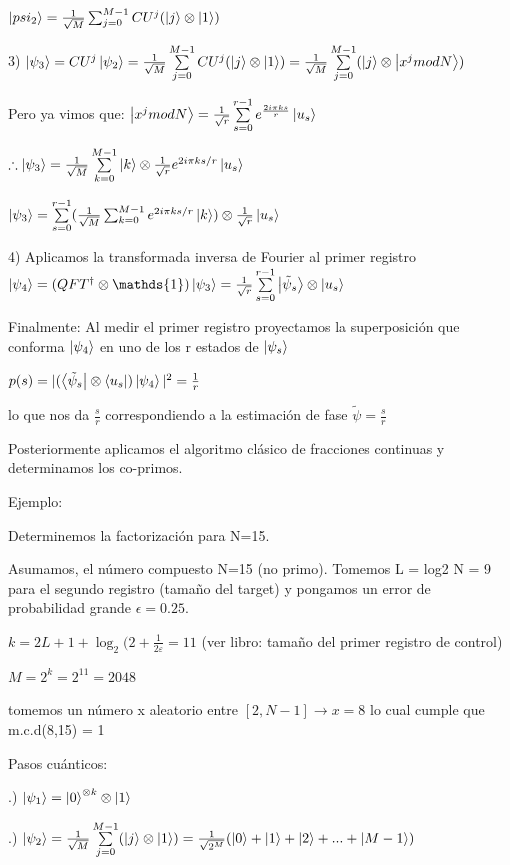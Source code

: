 \documentclass[11pt, spanish]{report}
\begin{document}
$\ket{psi_2} = \frac{1}{\sqrt{M}} \sum_{j=0}^{M-1} CU^j (\ket{j} \otimes \ket{1})$

3) $\ket{\psi_3} = CU^j \ket{\psi_2} = \frac{1}{\sqrt{M}} \sum\limits_{j=0}^{M-1} CU^j (\ket{j} \otimes \ket{1}) = \frac{1}{\sqrt{M}} \sum\limits_{j=0}^{M-1} (\ket{j} \otimes \ket{x^j mod N})$

Pero ya vimos que: $\ket{x^j mod N} = \frac{1}{\sqrt{r}} \sum\limits_{s=0}^{r-1} e^{\frac{2 i \pi k s}{r}} \ket{u_s}$

$\therefore \ket{\psi_3} = \frac{1}{\sqrt{M}} \sum\limits_{k=0}^{M-1} \ket{k} \otimes \frac{1}{\sqrt{r}} e^{2 i \pi k s/r} \ket{u_s}$

$\ket{\psi_3} = \sum\limits_{s=0}^{r-1} (\frac{1}{\sqrt{M}} \sum_{k=0}^{M-1} e^{2 i \pi k s/r} \ket{k}) \otimes \frac{1}{\sqrt{r}} \ket{u_s}$

4) Aplicamos la transformada inversa de Fourier al primer registro $\ket{\psi_4} = (QFT^\dagger \otimes \mathds{1}) \ket{\psi_3} = \frac{1}{\sqrt{r}} \sum\limits_{s=0}^{r-1} \ket{\tilde{\psi}_s} \otimes \ket{u_s}$

Finalmente: Al medir el primer registro proyectamos la superposición que conforma $\ket{\psi_4}$ en uno de los r estados de $\ket{\psi_s}$

$p(s) = |(\bra{\tilde{\psi}_s} \otimes \bra{u_s}) \ket{\psi_4}|^2 = \frac{1}{r}$

lo que nos da $\frac{s}{r}$ correspondiendo a la estimación de fase $\tilde{\psi} = \frac{s}{r}$

Posteriormente aplicamos el algoritmo clásico de fracciones continuas y determinamos los co-primos.

Ejemplo:

Determinemos la factorización para N=15.

Asumamos, el número compuesto N=15 (no primo). Tomemos L = log2 N = 9 para el segundo registro (tamaño del target) y pongamos un error de probabilidad grande $\epsilon = 0.25$.

$k = 2L + 1 + \log_2(2 + \frac{1}{2 \varepsilon} = 11$ (ver libro: tamaño del primer registro de control)

$M = 2^k = 2^{11} = 2048$

tomemos un número x aleatorio entre $[2, N-1] \rightarrow x = 8$ lo cual cumple que m.c.d(8,15) = 1

Pasos cuánticos:

.) $\ket{\psi_1} = \ket{0}^{\otimes k} \otimes \ket{1}$

.) $\ket{\psi_2} = \frac{1}{\sqrt{M}} \sum\limits_{j=0}^{M-1} (\ket{j} \otimes \ket{1}) = \frac{1}{\sqrt{2^M}} (\ket{0} + \ket{1} + \ket{2} + ... + \ket{M-1})$
\end{document}
